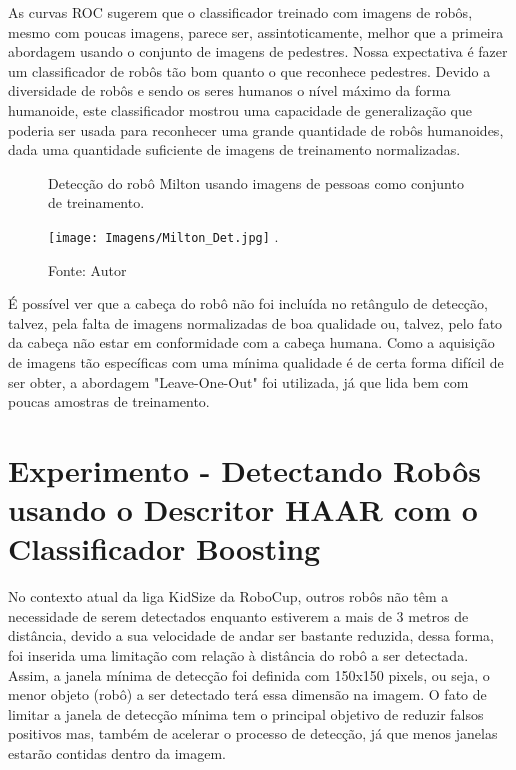 As curvas ROC sugerem que o classificador treinado com imagens de robôs, mesmo com poucas imagens, parece ser, assintoticamente, melhor que a primeira abordagem usando o conjunto de imagens de pedestres. Nossa expectativa é fazer um classificador de robôs tão bom quanto o que reconhece pedestres. Devido a diversidade de robôs e sendo os seres humanos o nível máximo da forma humanoide, este classificador mostrou uma capacidade de generalização que poderia ser usada para reconhecer uma grande quantidade de robôs humanoides, dada uma quantidade suficiente de imagens de treinamento normalizadas.

\begin{figure}[!h!t!]
\centering \caption{Detecção do robô Milton usando imagens de pessoas como conjunto de treinamento.}
\texttt{[image: Imagens/Milton\_Det.jpg]}
\DeclareGraphicsExtensions.
\caption*{Fonte: Autor }
\label{Fig:Miltondet}
\end{figure} 

É possível ver que a cabeça do robô não foi incluída no retângulo de detecção, talvez, pela falta de imagens normalizadas de boa qualidade ou, talvez, pelo fato da cabeça não estar em conformidade com a cabeça humana.
Como a aquisição de imagens tão específicas com uma mínima qualidade é de certa forma difícil de ser obter, a abordagem "Leave-One-Out" foi utilizada, já que lida bem com poucas amostras de treinamento.


\pagebreak

\section{Experimento - Detectando Robôs usando o Descritor HAAR com o Classificador Boosting}
\label{exp:HAAR-Boosting}
No contexto atual da liga KidSize da RoboCup, outros robôs não têm a necessidade de serem detectados enquanto estiverem a mais de 3 metros de distância, devido a sua velocidade de andar ser bastante reduzida, dessa forma, foi inserida uma limitação com relação à distância do robô a ser detectada.  Assim, a janela mínima de detecção foi definida com 150x150 pixels, ou seja, o menor objeto (robô) a ser detectado terá essa dimensão na imagem. O fato de limitar a janela de detecção mínima tem o principal objetivo de reduzir falsos positivos mas, também de acelerar o processo de detecção, já que menos janelas estarão contidas dentro da imagem. 

